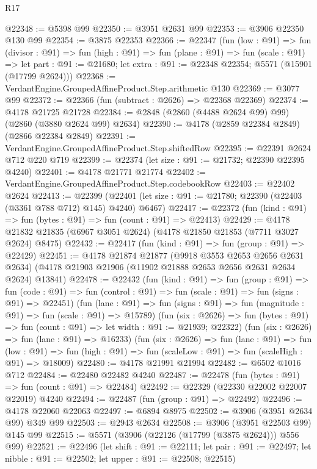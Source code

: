 \begin{lexlean}{R17}
\begin{coremodule}
@22348 := @5398 @99
@22350 := @3951 @2631 @99
@22353 := @3906 @22350 @130 @99
@22354 := @3875 @22353
@22366 := @22347
    (fun (low : @91) =>
    fun (divisor : @91) =>
    fun (high : @91) =>
    fun (plane : @91) =>
    fun (scale : @91) =>
    let part : @91 := @21680; let extra : @91 := @22348 @22354; @5571 (@15901 (@17799 @2624)))
@22368 := VerdantEngine.GroupedAffineProduct.Step.arithmetic @130
@22369 := @3077 @99
@22372 := @22366 (fun (subtract : @2626) => @22368 @22369)
@22374 := @4178 @21725 @21728
@22384 := @2848 (@2860 (@4488 @2624 @99) @99) (@2860 (@3880 @2624 @99) @2634)
@22390 := @4178 (@2859 @22384 @2849) (@2866 @22384 @2849)
@22391 := VerdantEngine.GroupedAffineProduct.Step.shiftedRow
@22395 := @22391 @2624 @712 @220 @719
@22399 := @22374 (let size : @91 := @21732; @22390 @22395 @4240)
@22401 := @4178 @21771 @21774
@22402 := VerdantEngine.GroupedAffineProduct.Step.codebookRow
@22403 := @22402 @2624
@22413 := @22399
    (@22401 (let size : @91 := @21780; @22390 (@22403 (@3361 @788 @712) @145) @4240) @6467)
@22417 := @22372 (fun (kind : @91) => fun (bytes : @91) => fun (count : @91) => @22413)
@22429 := @4178 @21832 @21835 (@6967 @3051 @2624) (@4178 @21850 @21853 (@7711 @3027 @2624) @8475)
@22432 := @22417 (fun (kind : @91) => fun (group : @91) => @22429)
@22451 := @4178
    @21874
    @21877
    (@9918 @3553 @2653 @2656 @2631 @2634)
    (@4178 @21903 @21906 (@11902 @21888 @2653 @2656 @2631 @2634 @2624) @13841)
@22478 := @22432
    (fun (kind : @91) =>
    fun (group : @91) =>
    fun (code : @91) => fun (control : @91) => fun (scale : @91) => fun (signs : @91) => @22451)
    (fun (lane : @91) => fun (signs : @91) => fun (magnitude : @91) => fun (scale : @91) => @15789)
    (fun (six : @2626) =>
    fun (bytes : @91) => fun (count : @91) => let width : @91 := @21939; @22322)
    (fun (six : @2626) => fun (lane : @91) => @16233)
    (fun (six : @2626) =>
    fun (lane : @91) =>
    fun (low : @91) => fun (high : @91) => fun (scaleLow : @91) => fun (scaleHigh : @91) => @18009)
@22480 := @4178 @21991 @21994
@22482 := @6502 @1016 @712
@22484 := @22480 @22482 @4240
@22487 := @22478 (fun (bytes : @91) => fun (count : @91) => @22484)
@22492 := @22329 (@22330 @22002 @22007 @22019) @4240
@22494 := @22487 (fun (group : @91) => @22492)
@22496 := @4178 @22060 @22063
@22497 := @6894 @8975
@22502 := @3906 (@3951 @2634 @99) @349 @99
@22503 := @2943 @2634
@22508 := @3906 (@3951 @22503 @99) @145 @99
@22515 := @5571 (@3906 (@22126 (@17799 (@3875 @2624))) @556 @99)
@22521 := @22496
    (let shift : @91 := @22111;
    let pair : @91 := @22497; let nibble : @91 := @22502; let upper : @91 := @22508; @22515)

\end{coremodule}
\end{lexlean}
